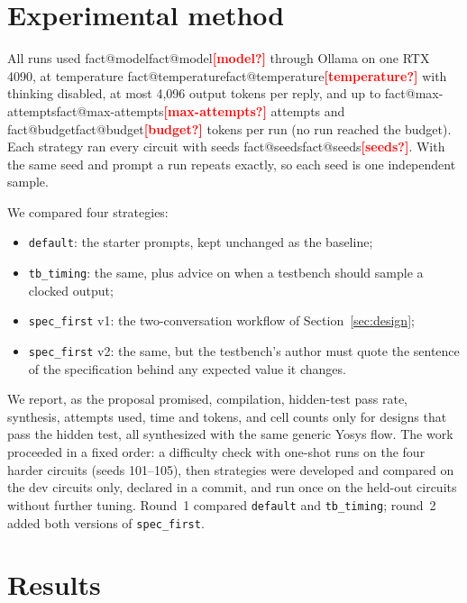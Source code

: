 \documentclass[11pt,a4paper]{article}
\makeatletter
\newcommand{\fact}[1]{\ifcsname fact@#1\endcsname\csname fact@#1\endcsname\else\textcolor{red}{\textbf{[#1?]}}\fi}
\newcommand{\up}[1]{\textcolor{good}{#1}}
\newcommand{\down}[1]{\textcolor{bad}{#1}}
\makeatother
\begin{document}
\section{Experimental method}\label{sec:method}

All runs used \fact{model} through Ollama on one RTX 4090, at temperature \fact{temperature} with thinking disabled,
at most 4,096 output tokens per reply, and up to \fact{max-attempts} attempts and \fact{budget} tokens per run (no
run reached the budget). Each strategy ran every circuit with seeds \fact{seeds}. With the same seed and prompt a run
repeats exactly, so each seed is one independent sample.

We compared four strategies:
\begin{itemize}
  \item \texttt{default}: the starter prompts, kept unchanged as the baseline;
  \item \texttt{tb\_timing}: the same, plus advice on when a testbench should sample a clocked output;
  \item \texttt{spec\_first} v1: the two-conversation workflow of Section~\ref{sec:design};
  \item \texttt{spec\_first} v2: the same, but the testbench's author must quote the sentence of the specification
        behind any expected value it changes.
\end{itemize}

We report, as the proposal promised, compilation, hidden-test pass rate, synthesis, attempts used, time and tokens,
and cell counts only for designs that pass the hidden test, all synthesized with the same generic Yosys flow. The
work proceeded in a fixed order: a difficulty check with one-shot runs on the four harder circuits (seeds 101--105),
then strategies were developed and compared on the dev circuits only, declared in a commit, and run once on the
held-out circuits without further tuning. Round~1 compared \texttt{default} and \texttt{tb\_timing}; round~2 added
both versions of \texttt{spec\_first}.

\section{Results}\label{sec:results}

\begin{table}[H]
\centering\small\setlength{\tabcolsep}{4.5pt}

\caption{One-shot vs.\ iterative, per strategy and split (25 runs each). \up{Green}: revising helped overall;
\down{red}: it hurt. ``Own checks reject correct'': share of correct designs (by the hidden test) that the agent's
own development checks failed.}
\label{tab:strategy}
\end{table}
\end{document}
